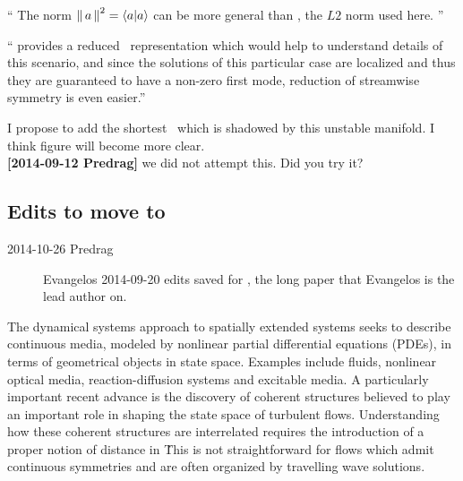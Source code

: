 \begin{description}
``
The norm $\norm{a}^2=\braket{a}{a}$ can be more general than
, the $L2$ norm used here.
''

``{\FFslice} provides a reduced \statesp\ representation which would
help to understand details of this scenario, and since the solutions of this
particular case are localized and thus they are guaranteed to have a non-zero
first mode, reduction of streamwise symmetry is even easier.''

\item[2014-09-12 Evangelos]
I propose to add the shortest \rpo\ which is shadowed by this unstable
manifold. I think figure will become more clear.
\\{\bf [2014-09-12 Predrag]} we did not attempt this. Did you try it?





\end{description}



\newpage
\subsection{Edits to move to }

\begin{description}

\item[2014-10-26 Predrag]
Evangelos 2014-09-20 edits saved for  , the long paper
that Evangelos is the lead author on.

\end{description}


The dynamical systems approach to spatially extended systems seeks to
describe continuous media, modeled by nonlinear partial differential
equations (PDEs), in terms of geometrical objects in state space.
Examples include fluids, nonlinear optical media, reaction-diffusion
systems and excitable media. A particularly important recent advance is
the discovery of coherent structures
believed  to play an
important role in shaping the state space of turbulent flows.
Understanding how these coherent structures are interrelated requires the
introduction of a proper notion of distance in \statesp\. This is not
straightforward for flows which admit continuous symmetries and are often
organized by travelling wave solutions.

